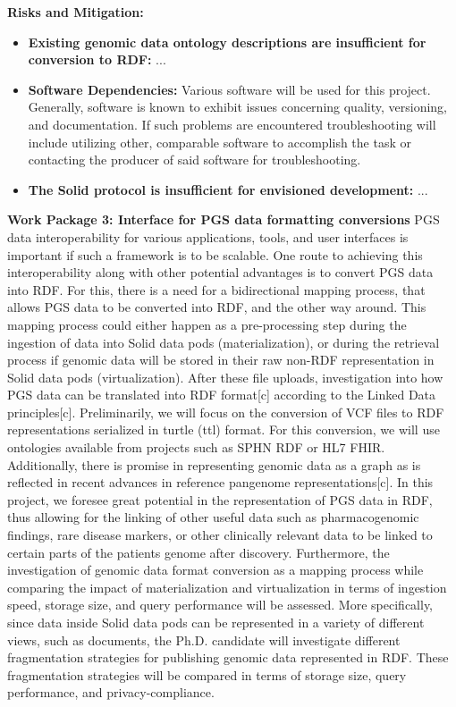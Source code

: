 \documentclass[11pt]{article}
\begin{document}
\textbf{Risks and Mitigation:} 
\begin{itemize}
	\item \textbf{Existing genomic data ontology descriptions are insufficient for conversion to RDF:} ...
	\item \textbf{Software Dependencies:} Various software will be used for this project. Generally, software is known to exhibit issues concerning quality, versioning, and documentation. If such problems are encountered troubleshooting will include utilizing other, comparable software to accomplish the task or contacting the producer of said software for troubleshooting.
	\item \textbf{The Solid protocol is insufficient for envisioned development:} ...
\end{itemize}

\textbf{Work Package 3:  Interface for PGS data formatting conversions}
PGS data interoperability for various applications, tools, and user interfaces is important if such a framework is to be scalable. 
One route to achieving this interoperability along with other potential advantages is to convert PGS data into RDF. For this, there is a need for a bidirectional mapping process, that allows PGS data to be converted into RDF, and the other way around. 
This mapping process could either happen as a pre-processing step during the ingestion of data into Solid data pods (materialization), or during the retrieval process if genomic data will be stored in their raw non-RDF representation in Solid data pods (virtualization).
After these file uploads, investigation into how PGS data can be translated into RDF format[c] according to the Linked Data principles[c]. 
Preliminarily, we will focus on the conversion of VCF files to RDF representations serialized in turtle (ttl) format. 
For this conversion, we will use ontologies available from projects such as SPHN RDF or HL7 FHIR. 
Additionally, there is promise in representing genomic data as a graph as is reflected in recent advances in reference pangenome representations[c]. 
In this project, we foresee great potential in the representation of PGS data in RDF, thus allowing for the linking of other useful data such as pharmacogenomic findings, rare disease markers, or other clinically relevant data to be linked to certain parts of the patient\textquotesingle s genome after discovery. 
Furthermore, the investigation of genomic data format conversion as a mapping process while comparing the impact of materialization and virtualization in terms of ingestion speed, storage size, and query performance will be assessed. 
More specifically, since data inside Solid data pods can be represented in a variety of different views, such as documents, the Ph.D. candidate will investigate different fragmentation strategies for publishing genomic data represented in RDF. 
These fragmentation strategies will be compared in terms of storage size, query performance, and privacy-compliance.
\end{document}
